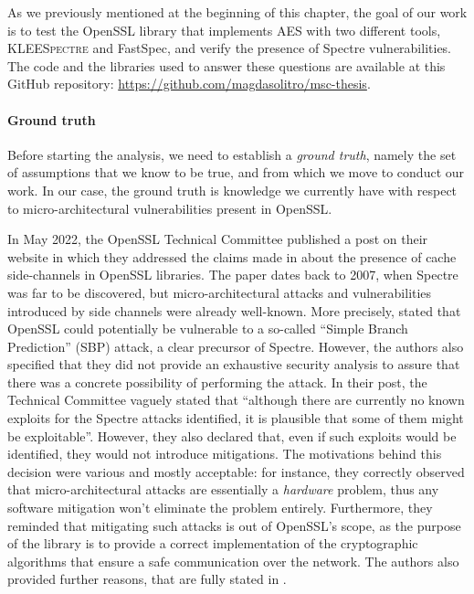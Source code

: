 \documentclass[target=mst,aauheader=aics]{thud}
\theoremstyle{definition}
\begin{document}
	As we previously mentioned at the beginning of this chapter, the goal of our work is to test the OpenSSL library that implements AES with two different tools, \textsc{KLEESpectre} and FastSpec, and verify the presence of Spectre vulnerabilities. The code and the libraries used to answer these questions are available at this GitHub repository: \url{https://github.com/magdasolitro/msc-thesis}.
	
	\paragraph{Ground truth} Before starting the analysis, we need to establish a \textit{ground truth}, namely the set of assumptions that we know to be true, and from which we move to conduct our work. In our case, the ground truth is knowledge we currently have with respect to micro-architectural vulnerabilities present in OpenSSL. 
	
	In May 2022, the OpenSSL Technical Committee published a post on their website \cite{OpenSSL_spectre} in which they addressed the claims made in \cite{Gueron2007} about the presence of cache side-channels in OpenSSL libraries. The paper dates back to 2007, when Spectre was far to be discovered, but micro-architectural attacks and vulnerabilities introduced by side channels were already well-known. More precisely, \cite{Gueron2007} stated that OpenSSL could potentially be vulnerable to a so-called ``Simple Branch Prediction'' (SBP) attack, a clear precursor of Spectre. However, the authors also specified that they did not provide an exhaustive security analysis to assure that there was a concrete possibility of performing the attack. In their post, the Technical Committee vaguely stated that ``although there are currently no known exploits for the Spectre attacks identified, it is plausible that some of them might be exploitable''. However, they also declared that, even if such exploits would be identified, they would not introduce mitigations. The motivations behind this decision were various and mostly acceptable: for instance, they correctly observed that micro-architectural attacks are essentially a \textit{hardware} problem, thus any software mitigation won't eliminate the problem entirely. Furthermore, they reminded that mitigating such attacks is out of OpenSSL's scope, as the purpose of the library is to provide a correct implementation of the cryptographic algorithms that ensure a safe communication over the network. The authors also provided further reasons, that are fully stated in \cite{OpenSSL_spectre}.
	
\end{document}
